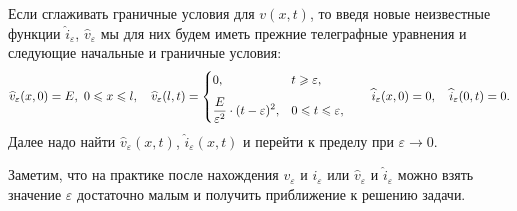 \documentclass[12pt,a4paper,openany,fleqn]{book}
\newcommand{\eps}{\varepsilon}
\theoremstyle{definition}
\begin{document}
\begin{enumerateD}
		Если сглаживать граничные условия для $v(x,t)$, то введя новые неизвестные функции $\widehat{i}_{\eps}$, $\widehat{v}_{\eps}$ мы для них будем иметь прежние телеграфные уравнения и следующие начальные и граничные условия:
		\begin{equation*}
			\hfill \widehat{v}_{\eps}(x,0)=E,\ 0\leqslant x\leqslant l,\quad \widehat{v}_{\eps}(l,t)=\begin{cases}
				0,& t\geqslant\eps,\\[7pt]
				\displaystyle \frac{E}{\eps^2}\cdot(t-\eps)^2,&0\leqslant t\leqslant\eps,
			\end{cases}\qquad \widehat{i}_{\eps}(x,0)=0,\quad\widehat{i}_{\eps}(0,t)=0. \hfill
		\end{equation*} 
		Далее надо найти $\widehat{v}_{\eps}(x,t)$, $\widehat{i}_{\eps}(x,t)$ и перейти к пределу при $\eps\to0$.
	\end{enumerateD}  
	
	Заметим, что на практике после нахождения $v_{\eps}$ и $i_{\eps}$ или $\widehat{v}_{\eps}$ и $\widehat{i}_{\eps}$ можно взять значение $\eps$ достаточно малым и получить приближение к решению задачи.
\end{document}
